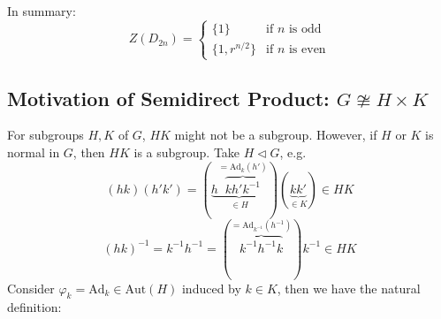 In summary:
\[
Z(D_{2n}) = \begin{cases} \{1\} & \text{if } n \text{ is odd} \\ \{1, r^{n/2}\} & \text{if } n \text{ is even} \end{cases}
\]
\subsection{Motivation of Semidirect Product: \texorpdfstring{$G\ncong H\times K$}{Gncong Htimes K}}

For subgroups $H,K$ of $G$,  $HK$ might not be a subgroup. However, if $H$ or $K$ is normal in $G$, then $HK$ is a subgroup. Take $H\lhd G$, e.g.
\[
(hk)(h'k')=(\underbrace{ h\overbrace{ kh'k^{-1} }^{ =\mathrm{Ad}_{k}(h') } }_{ \in H })(\underbrace{ kk' }_{ \in K })\in HK
\]
\[
(hk)^{-1}=k^{-1}h^{-1}=(\overbrace{ k^{-1}h^{-1}k }^{ =\mathrm{Ad}_{k^{-1}}(h^{-1}) })k^{-1}\in HK
\]
Consider $\varphi _k=\mathrm{Ad}_k \in \mathrm{Aut}(H)$ induced by $k\in K$, then we have the natural definition:

